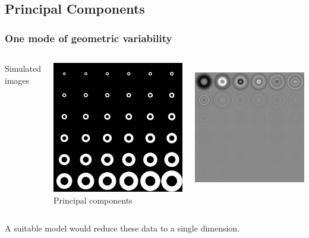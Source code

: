 \documentclass{beamer}
\begin{document}
\subsection{Principal Components}
\begin{frame}
\frametitle{One mode of geometric variability}
\begin{columns}[c]
Simulated images\par
\includegraphics[height=0.9\textwidth]{circles}
Principal components\par
\includegraphics[height=0.9\textwidth]{circles_pca}
\end{columns}
A suitable model would reduce these data to a single dimension.
\end{frame}
\end{document}
